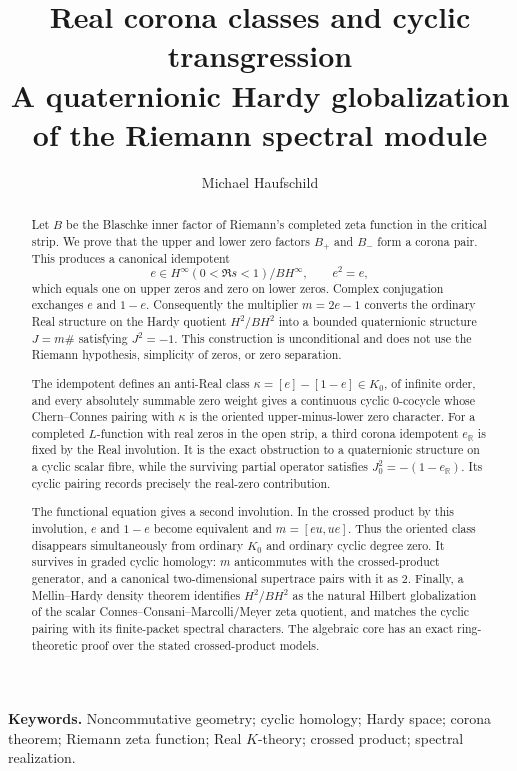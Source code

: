 \documentclass[11pt]{article}
\title{\textbf{Real corona classes and cyclic transgression}\\
\large A quaternionic Hardy globalization of the Riemann spectral module}
\author{Michael Haufschild}
\date{}
\theoremstyle{definition}
\theoremstyle{remark}
\newcommand{\R}{\mathbb R}
\begin{document}
\maketitle

\begin{abstract}
Let $B$ be the Blaschke inner factor of Riemann's completed zeta function in the
critical strip.  We prove that the upper and lower zero factors $B_+$ and $B_-$
form a corona pair.  This produces a canonical idempotent
\[
 e\in H^\infty(0<\Re s<1)/BH^\infty,
 \qquad e^2=e,
\]
which equals one on upper zeros and zero on lower zeros.  Complex conjugation
exchanges $e$ and $1-e$.  Consequently the multiplier $m=2e-1$ converts the
ordinary Real structure on the Hardy quotient $H^2/BH^2$ into a bounded
quaternionic structure $J=m\#$ satisfying $J^2=-1$.  This construction is
unconditional and does not use the Riemann hypothesis, simplicity of zeros, or
zero separation.

The idempotent defines an anti-Real class
$\kappa=[e]-[1-e]\in K_0$, of infinite order, and every absolutely summable
zero weight gives a continuous cyclic $0$-cocycle whose Chern--Connes pairing
with $\kappa$ is the oriented upper-minus-lower zero character.  For a completed
$L$-function with real zeros in the open strip, a third corona idempotent
$e_{\R}$ is fixed by the Real involution.  It is the exact obstruction to a
quaternionic structure on a cyclic scalar fibre, while the surviving partial
operator satisfies $J_0^2=-(1-e_{\R})$.  Its cyclic pairing records precisely
the real-zero contribution.

The functional equation gives a second involution.  In the crossed product by
this involution, $e$ and $1-e$ become equivalent and
$m=[eu,ue]$.  Thus the oriented class disappears simultaneously from ordinary
$K_0$ and ordinary cyclic degree zero.  It survives in graded cyclic homology:
$m$ anticommutes with the crossed-product generator, and a canonical
two-dimensional supertrace pairs with it as $2$.  Finally, a Mellin--Hardy
density theorem identifies $H^2/BH^2$ as the natural Hilbert globalization of
the scalar Connes--Consani--Marcolli/Meyer zeta quotient, and matches the cyclic
pairing with its finite-packet spectral characters.  The algebraic core has an
exact ring-theoretic proof over the stated crossed-product models.
\end{abstract}

\medskip
\noindent\textbf{Keywords.}
Noncommutative geometry; cyclic homology; Hardy space; corona theorem;
Riemann zeta function; Real $K$-theory; crossed product; spectral realization.
\end{document}

